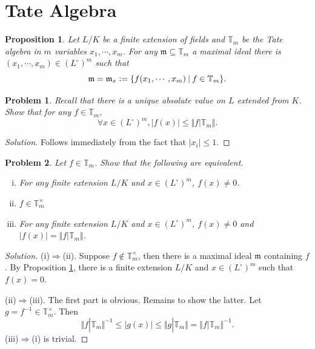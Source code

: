 \documentclass[8pt]{article}
\numberwithin{equation}{section}
\newenvironment{solution}{\begin{proof}[Solution]}{\end{proof}}
\newtheorem{proposition}{Proposition}[section]
\newtheorem{problem}{Problem}[section]
\newcommand{\defeq}{\vcentcolon=}
\newcommand{\norm}[1]{\Vert #1 \Vert}
\newcommand{\m}[0]{\mathfrak{m}}
\newcommand{\T}[0]{\mathbb{T}}
\newcommand{\sep}[0]{\:|\:}
\newcommand{\ab}[1]{\vert #1 \vert}
\begin{document}
\section{Tate Algebra}
\begin{proposition}
  \label{max_ideal_tate_algebra}
  Let $L/K$ be a finite extension of fields and $\T_m$ be the Tate algebra in $m$ variables $x_1,\cdots,x_m$. For any $\m\subseteq \T_m$ a maximal ideal there is $(x_1,\cdots,x_m)\in (L^\circ)^m$ such that 
  \begin{equation*}
    \m = \m_x\defeq \{f(x_1,\cdots,x_m)\sep f\in\T_m\}.
  \end{equation*}
\end{proposition}
\begin{problem}
  Recall that there is a unique absolute value on $L$ extended from $K$. Show that for any $f\in\T_m$,
  \begin{equation*}
    \forall x\in(L^\circ)^m, \ab{f(x)}\leq\norm{f|\T_m}.
  \end{equation*}
\end{problem}
\begin{solution}
  Follows immediately from the fact that $\ab{x_i}\leq 1$.
\end{solution}
\begin{problem}
  Let $f\in\T_m$. Show that the following are equivalent.
  \begin{enumerate}[(i).]
    \item For any finite extension $L/K$ and $x\in (L^\circ)^m$, $f(x)\not=0$.
    \item $f\in\T_m^\times$
    \item For any finite extension $L/K$ and $x\in (L^\circ)^m$, $f(x)\not=0$ and $\ab{f(x)}=\norm{f|\T_m}$.
  \end{enumerate}
\end{problem}
\begin{solution}
  (i)$\Rightarrow$(ii). Suppose $f\not\in\T_m^\times$, then there is a maximal ideal $\m$ containing $f$. By Proposition \ref{max_ideal_tate_algebra}, there is a finite extension $L/K$ and $x\in (L^\circ)^m$ such that $f(x) = 0$. 
  \par (ii)$\Rightarrow$(iii). The first part is obvious. Remains to show the latter. Let $g=f^{-1}\in\T_m^\times$. Then 
  \begin{equation*}
    \norm{f|\T_m}^{-1}\leq \ab{g(x)}\leq \norm{g|\T_m} = \norm{f|\T_m}^{-1}.
  \end{equation*}
  (iii)$\Rightarrow$(i) is trivial.
\end{solution}
\end{document}
